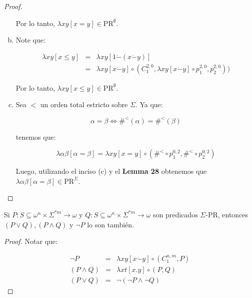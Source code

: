 \begin{proof}
\begin{enumerate}[a)]
        \PN Por lo tanto, $\lambda xy \left[x=y\right] \in \mathrm{PR}^{\emptyset}$.

      \item Note que:

        \begin{eqnarray*}
          \lambda xy \left[x \leq y\right] &=& \lambda xy\left[1 \dot{-}(x \dot{-}y)\right] \\
          &=& \lambda xy \left[x \dot{-}y\right] \circ (C_{1}^{2,0}, \lambda xy \left[x \dot{-}y\right] \circ
            p_{1}^{2,0}, p_{2}^{2,0}))
        \end{eqnarray*}

        \PN Por lo tanto, $\lambda xy \left[x \leq y\right] \in \mathrm{PR}^{\emptyset}$.

      \item Sea $<$ un orden total estricto sobre $\Sigma$. Ya que:

        \[
          \alpha = \beta \Leftrightarrow \#^{<}(\alpha) = \#^{<}(\beta)
        \]

        \PN tenemos que:

        \[
          \lambda \alpha\beta \left[\alpha=\beta\right] = \lambda xy \left[x=y\right] \circ (\#^{<} \circ p_{1}^{0,2},
          \#^{<} \circ p_{2}^{0,2})
        \]

        \PN Luego, utilizando el inciso (c) y el \textbf{Lemma 28} obtenemos que $\lambda \alpha\beta
        \left[\alpha=\beta\right] \in \mathrm{PR}^{\Sigma}$.
    \end{enumerate}
  \end{proof}

  \begin{lemma}
    \PN Si $P: S \subseteq \omega^{n} \times \Sigma^{\ast m} \rightarrow \omega$ y $Q: S \subseteq \omega^{n} \times
    \Sigma^{\ast m} \rightarrow \omega$ son predicados $\Sigma$-PR, entonces $(P \vee Q), (P \wedge Q)$ y $\neg P$ lo
    son también.
  \end{lemma}
  \begin{proof}
    \PN Notar que:

    \begin{eqnarray*}
      \neg P &=& \lambda xy \left[x \dot{-} y\right] \circ (C_{1}^{n, m}, P) \\
      (P \wedge Q) &=& \lambda xt \left[x.y\right] \circ (P, Q) \\
      (P \vee Q) &=& \neg (\neg P \wedge \neg Q)
    \end{eqnarray*}
  \end{proof}

